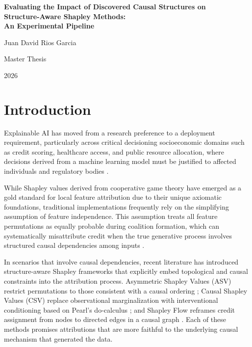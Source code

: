\documentclass[12pt,a4paper,oneside]{article}
\begin{document}

\begin{titlepage}
  \centering
  \vspace*{2cm}
  {\LARGE\bfseries Evaluating the Impact of Discovered Causal Structures on\\[0.4em]
  Structure-Aware Shapley Methods:\\[0.4em]
  An Experimental Pipeline\par}
  \vspace{2cm}
  {\large Juan David Rios Garcia\par}
  \vfill
  {\large Master Thesis\par}
  \vspace{1cm}
  {\large 2026\par}
\end{titlepage}

\newpage
\tableofcontents
\newpage

\section{Introduction}
\label{sec:intro}

Explainable AI has moved from a research preference to a deployment requirement, particularly across critical decisioning socioeconomic domains such as credit scoring, healthcare access, and public resource allocation, where decisions derived from a machine learning model must be justified to affected individuals and regulatory bodies \citep{Baron2023}.

While Shapley values derived from cooperative game theory have emerged as a gold standard for local feature attribution due to their unique axiomatic foundations, traditional implementations frequently rely on the simplifying assumption of feature independence. This assumption treats all feature permutations as equally probable during coalition formation, which can systematically misattribute credit when the true generative process involves structured causal dependencies among inputs \citep{Lundberg2017, Heskes2020}.

In scenarios that involve causal dependencies, recent literature has introduced structure-aware Shapley frameworks that explicitly embed topological and causal constraints into the attribution process. Asymmetric Shapley Values (ASV) restrict permutations to those consistent with a causal ordering \citep{Frye2021}; Causal Shapley Values (CSV) replace observational marginalization with interventional conditioning based on Pearl's do-calculus \citep{Heskes2020}; and Shapley Flow reframes credit assignment from nodes to directed edges in a causal graph \citep{Wang2021}. Each of these methods promises attributions that are more faithful to the underlying causal mechanism that generated the data.
\end{document}
